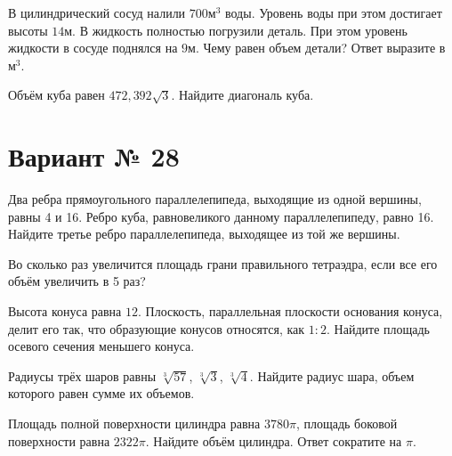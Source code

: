 \documentclass[4apaper]{article}
\begin{document}
\begin{taskBN}{5}
В цилиндрический сосуд налили $700\mbox{м}^3$ воды. Уровень воды при этом достигает высоты $14$м. В жидкость полностью погрузили деталь. При этом уровень жидкости в сосуде поднялся на $9$м. Чему равен объем детали? Ответ выразите в $\mbox{м}^3$.
\end{taskBN}

\begin{taskBN}{6}
Объём куба равен $472,392\sqrt{3}$. Найдите диагональ куба.
\end{taskBN}
\newpage\section*{Вариант № 28}

\begin{taskBN}{1}
Два ребра прямоугольного параллелепипеда, выходящие из одной вершины, равны 4 и 16. Ребро куба, равновеликого данному параллелепипеду, равно 16. Найдите третье ребро параллелепипеда, выходящее из той же вершины.
\end{taskBN}

\begin{taskBN}{2}
Во сколько раз увеличится площадь грани правильного тетраэдра, если все его объём увеличить в 5 раз?
\end{taskBN}

\begin{taskBN}{3}
Высота конуса равна $12$. Плоскость, параллельная плоскости основания конуса,  делит его так, что образующие конусов относятся, как $1:2$. Найдите площадь осевого сечения меньшего конуса. 
\end{taskBN}

\begin{taskBN}{4}
Радиусы трёх шаров равны $\sqrt[3]{57}$, $\sqrt[3]{3}$, $\sqrt[3]{4}$. Найдите радиус шара, объем которого равен сумме их объемов.
\end{taskBN}

\begin{taskBN}{5}
Площадь полной поверхности цилиндра равна $3780\pi$, площадь боковой поверхности равна $2322\pi$. Найдите объём цилиндра. Ответ сократите на $\pi$.
\end{taskBN}
\end{document}
